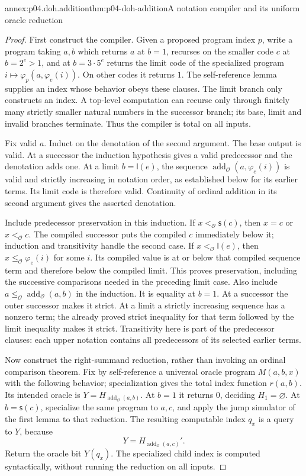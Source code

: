 \begin{annexitem}{annex:p04.doh.addition}{thm:p04-doh-addition}{A notation compiler and its uniform oracle reduction}
\begin{proof}
First construct the compiler. Given a proposed program index \(p\),
write a program taking \(a,b\) which returns \(a\) at \(b=1\),
recurses on the smaller code \(c\) at \(b=2^c>1\), and at
\(b=3\cdot5^e\) returns the limit code of the specialized program
\(i\mapsto\varphi_p(a,\varphi_e(i))\). On other codes it returns
\(1\). The self-reference lemma supplies an index whose behavior
obeys these clauses. The limit branch only constructs an index. A
top-level computation can recurse only through finitely many strictly
smaller natural numbers in the successor branch; its base, limit and
invalid branches terminate. Thus the compiler is total on all inputs.

Fix valid \(a\). Induct on the denotation of the second argument.
The base output is valid. At a successor the induction hypothesis
gives a valid predecessor and the denotation adds one. At a limit
\(b=\mathsf l(e)\), the sequence
\(\operatorname{add}_{\mathcal O}(a,\varphi_e(i))\) is valid and
strictly increasing in notation order, as established below for its
earlier terms. Its limit code is therefore valid. Continuity of
ordinal addition in its second argument gives the asserted denotation.

Include predecessor preservation in this induction. If
\(x<_{\mathcal O}\mathsf s(c)\), then \(x=c\) or
\(x<_{\mathcal O}c\). The compiled successor puts the compiled
\(c\) immediately below it; induction and transitivity handle the
second case. If \(x<_{\mathcal O}\mathsf l(e)\), then
\(x\leq_{\mathcal O}\varphi_e(i)\) for some \(i\).
Its compiled value is at or below that compiled sequence term and
therefore below the compiled limit. This proves preservation,
including the successive comparisons needed in the preceding limit
case. Also include \(a\leq_{\mathcal O}\operatorname{add}_{\mathcal O}(a,b)\)
in the induction. It is equality at \(b=1\). At a successor the
outer successor makes it strict. At a limit a strictly increasing
sequence has a nonzero term; the already proved strict inequality
for that term followed by the limit inequality makes it strict.
Transitivity here is part of the predecessor clauses: each upper
notation contains all predecessors of its selected earlier terms.

Now construct the right-summand reduction, rather than invoking an
ordinal comparison theorem. Fix by self-reference a universal oracle
program \(M(a,b,x)\) with the following behavior; specialization
gives the total index function \(r(a,b)\). Its intended oracle is
\(Y=H_{\operatorname{add}_{\mathcal O}(a,b)}\).
At \(b=1\) it returns \(0\), deciding \(H_1=\varnothing\).
At \(b=\mathsf s(c)\), specialize the same program to \(a,c\),
and apply the jump simulator of the first lemma to that reduction.
The resulting computable index \(q_x\) is a query to \(Y\), because
\[
 Y=H_{\operatorname{add}_{\mathcal O}(a,c)}'.
\]
Return the oracle bit \(Y(q_x)\). The specialized child index is
computed syntactically, without running the reduction on all inputs.


\end{proof}
\end{annexitem}
